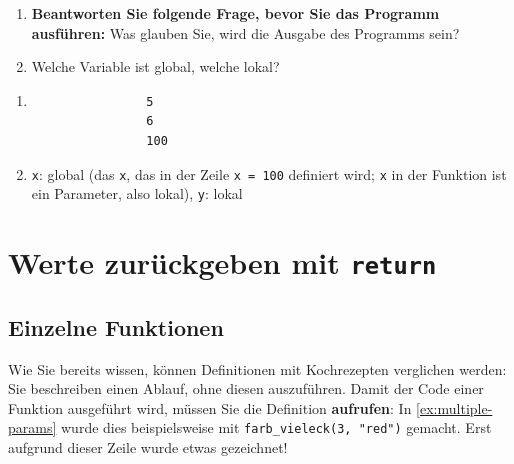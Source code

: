 \begin{myexercise}
	
	\begin{enumerate}
		\item \textbf{Beantworten Sie folgende Frage, bevor Sie das Programm ausführen:} Was glauben Sie, wird die Ausgabe des Programms sein?
		\item Welche Variable ist global, welche lokal?
	\end{enumerate}
	\begin{myanswer}
		\begin{enumerate}
			\item \begin{lstlisting}
				5
				6
				100
			\end{lstlisting}
			\item \lstinline|x|: global (das \lstinline|x|, das in der Zeile \lstinline|x = 100| definiert wird; \lstinline|x| in der Funktion ist ein Parameter, also lokal), \lstinline|y|: lokal
		\end{enumerate}
	\end{myanswer}
\end{myexercise}

% 		
\newpage

\section{Werte zurückgeben mit \texorpdfstring{\lstinline|return|}{return}}
\subsection{Einzelne Funktionen}
Wie Sie bereits wissen, können Definitionen mit Kochrezepten verglichen werden: Sie beschreiben einen Ablauf, ohne diesen auszuführen. Damit der Code einer Funktion ausgeführt wird, müssen Sie die Definition \textbf{aufrufen}: In \cref{ex:multiple-params} wurde dies beispielsweise mit \lstinline|farb_vieleck(3, "red")| gemacht. Erst aufgrund dieser Zeile wurde etwas gezeichnet!

